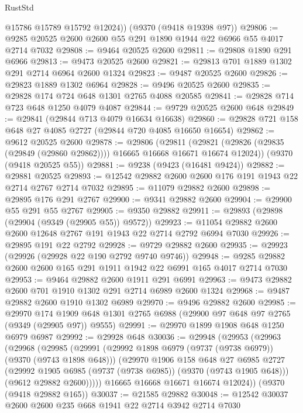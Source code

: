 \begin{lexlean}{RustStd}
\begin{coremodule}
{\begin{coremodule}
{{{{{{{{{{{{{{{{{{{{{{{{{{{{{{{{{{{{{{{        @15786
        @15789
        @15792
        @12024))
    (@9370 (@9418 @19398 @97))
@29806 := @9285 @20525 @2600 @2600 @55 @291 @1890 @1944 @22 @6966 @55 @4017 @2714 @7032
@29808 := @9464 @20525 @2600
@29811 := @29808 @1890 @291 @6966
@29813 := @9473 @20525 @2600
@29821 := @29813 @701 @1889 @1302 @291 @2714 @6964 @2600 @1324
@29823 := @9487 @20525 @2600
@29826 := @29823 @1889 @1302 @6964
@29828 := @9496 @20525 @2600
@29835 := @29828 @174 @724 @648 @1301 @2765 @4088 @20585
@29841 := @29828 @714 @723 @648 @1250 @4079 @4087
@29844 := @9729 @20525 @2600 @648
@29849 := @29841 (@29844 @713 @4079 @16634 @16638)
@29860 := @29828 @721 @158 @648 @27 @4085 @2727 (@29844 @720 @4085 @16650 @16654)
@29862 := @9612 @20525 @2600
@29878 := @29806
    (@29811 (@29821 (@29826 (@29835 (@29849 (@29860 @29862)))) @16665 @16668 @16671 @16674 @12024))
    (@9370 (@9418 @20525 @55))
@29881 := @9238 (@9423 (@16481 @9424))
@29882 := @29881 @20525
@29893 := @12542 @29882 @2600 @2600 @176 @191 @1943 @22 @2714 @2767 @2714 @7032
@29895 := @11079 @29882 @2600
@29898 := @29895 @176 @291 @2767
@29900 := @9341 @29882 @2600
@29904 := @29900 @55 @291 @55 @2767
@29905 := @9350 @29882
@29911 := @29893 (@29898 (@29904 (@9349 (@29905 @55)) @9572))
@29923 := @11054 @29882 @2600 @2600 @12648 @2767 @191 @1943 @22 @2714 @2792 @6994 @7030
@29926 := @29895 @191 @22 @2792
@29928 := @9729 @29882 @2600
@29935 := @29923 (@29926 (@29928 @22 @190 @2792 @9740 @9746))
@29948 := @9285 @29882 @2600 @2600 @165 @291 @1911 @1942 @22 @6991 @165 @4017 @2714 @7030
@29953 := @9464 @29882 @2600 @1911 @291 @6991
@29963 := @9473 @29882 @2600 @701 @1910 @1302 @291 @2714 @6989 @2600 @1324
@29968 := @9487 @29882 @2600 @1910 @1302 @6989
@29970 := @9496 @29882 @2600
@29985 := @29970
    @174
    @1909
    @648
    @1301
    @2765
    @6988
    (@29900 @97 @648 @97 @2765 (@9349 (@29905 @97)) @9555)
@29991 := @29970 @1899 @1908 @648 @1250 @6979 @6987
@29992 := @29928 @648
@30036 := @29948
    (@29953
      (@29963
        (@29968
          (@29985
            (@29991
              (@29992 @1898 @6979 (@9737 (@9738 @6979)) (@9370 (@9743 @1898 @648)))
              (@29970
                @1906
                @158
                @648
                @27
                @6985
                @2727
                (@29992 @1905 @6985 (@9737 (@9738 @6985)) (@9370 (@9743 @1905 @648)))
                (@9612 @29882 @2600)))))
        @16665
        @16668
        @16671
        @16674
        @12024))
    (@9370 (@9418 @29882 @165))
@30037 := @21585 @29882
@30048 := @12542 @30037 @2600 @2600 @235 @668 @1941 @22 @2714 @3942 @2714 @7030
}}}}}}}}}}}}}}}}}}}}}}}}}}}}}}}}}}}}}}}
\end{coremodule}}
\end{coremodule}
\end{lexlean}
